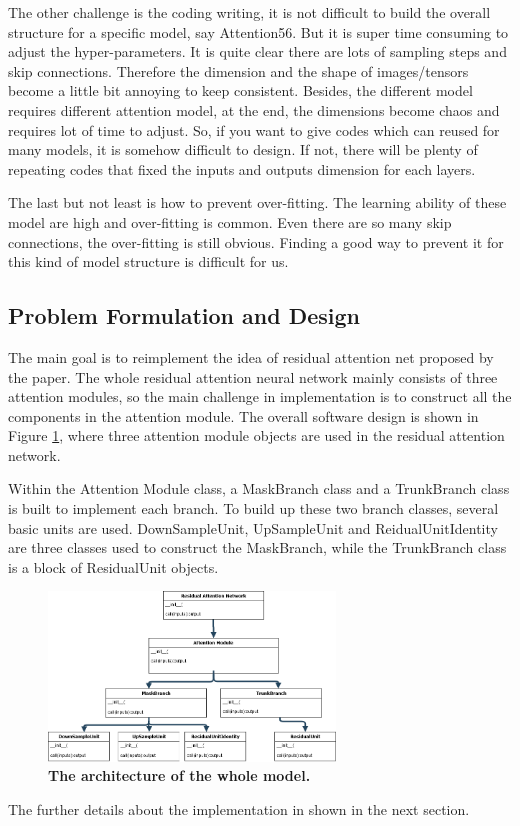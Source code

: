 \documentclass{article}
\newcommand{\mycaption}[2]{\caption[#1]{\textbf{#1.} #2}}
\begin{document}
\begin{multicols}{2}
The other challenge is the coding writing, it is not difficult to build the overall structure for a specific model, say Attention56. But it is super time consuming to adjust the hyper-parameters. It is quite clear there are lots of sampling steps and skip connections. Therefore the dimension and the shape of images/tensors become a little bit annoying to keep consistent. Besides, the different model requires different attention model, at the end, the dimensions become chaos and requires lot of time to adjust. So, if you want to give codes which can reused for many models, it is somehow difficult to design. If not, there will be plenty of repeating codes that fixed the inputs and outputs dimension for each layers. 

The last but not least is how to prevent over-fitting. The learning ability of these model are high and over-fitting is common. Even there are so many skip connections, the over-fitting is still obvious. Finding a good way to prevent it for this kind of model structure is difficult for us. 

\subsection{Problem Formulation and Design}
The main  goal is to reimplement the idea of residual attention net proposed by the paper. The whole residual attention neural network mainly consists of three attention modules, so the main challenge in implementation is to construct all the components in the attention module. The overall software design is shown in Figure \ref{fig:architect}, where three attention module objects are used in the residual attention network. 

Within the Attention Module class, a MaskBranch class and a TrunkBranch class is built to implement each branch. To build up these two branch classes, several basic units are used. DownSampleUnit, UpSampleUnit and ReidualUnitIdentity are three classes used to construct the MaskBranch, while the TrunkBranch class is a block of ResidualUnit objects. 
\begin{figure}[H] 
\includegraphics[width=3in]{imgs/Architect.png}  
\mycaption{The architecture of the whole model}{}  
\label{fig:architect}
\end{figure}
The further details about the implementation in shown in the next section. 


\end{multicols}
\end{document}
